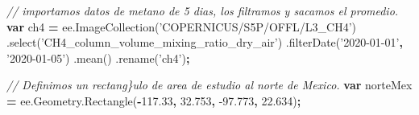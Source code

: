 \documentclass[
]{article}
\newenvironment{Shaded}{\begin{snugshade}}{\end{snugshade}}
\newcommand{\AttributeTok}[1]{\textcolor[rgb]{0.77,0.63,0.00}{#1}}
\newcommand{\CommentTok}[1]{\textcolor[rgb]{0.56,0.35,0.01}{\textit{#1}}}
\newcommand{\FloatTok}[1]{\textcolor[rgb]{0.00,0.00,0.81}{#1}}
\newcommand{\KeywordTok}[1]{\textcolor[rgb]{0.13,0.29,0.53}{\textbf{#1}}}
\newcommand{\NormalTok}[1]{#1}
\newcommand{\OperatorTok}[1]{\textcolor[rgb]{0.81,0.36,0.00}{\textbf{#1}}}
\newcommand{\StringTok}[1]{\textcolor[rgb]{0.31,0.60,0.02}{#1}}
\newcommand{\VariableTok}[1]{\textcolor[rgb]{0.00,0.00,0.00}{#1}}
\begin{document}
\begin{Shaded}
\begin{Highlighting}[]
\CommentTok{// importamos datos de metano de 5 dias, los filtramos y sacamos el promedio.}
\KeywordTok{var}\NormalTok{ ch4 }\OperatorTok{=} \VariableTok{ee}\NormalTok{.}\AttributeTok{ImageCollection}\NormalTok{(}\StringTok{'COPERNICUS/S5P/OFFL/L3_CH4'}\NormalTok{)}
\NormalTok{  .}\AttributeTok{select}\NormalTok{(}\StringTok{'CH4_column_volume_mixing_ratio_dry_air'}\NormalTok{)}
\NormalTok{  .}\AttributeTok{filterDate}\NormalTok{(}\StringTok{'2020-01-01'}\OperatorTok{,} \StringTok{'2020-01-05'}\NormalTok{)}
\NormalTok{  .}\AttributeTok{mean}\NormalTok{()}
\NormalTok{  .}\AttributeTok{rename}\NormalTok{(}\StringTok{'ch4'}\NormalTok{)}\OperatorTok{;}

\CommentTok{// Definimos un rectang\}ulo de area de estudio al norte de Mexico.}
\KeywordTok{var}\NormalTok{ norteMex }\OperatorTok{=}
  \VariableTok{ee}\NormalTok{.}\VariableTok{Geometry}\NormalTok{.}\AttributeTok{Rectangle}\NormalTok{(}\OperatorTok{-}\FloatTok{117.33}\OperatorTok{,} \FloatTok{32.753}\OperatorTok{,} \FloatTok{-97.773}\OperatorTok{,} \FloatTok{22.634}\NormalTok{)}\OperatorTok{;}


\end{Highlighting}
\end{Shaded}
\end{document}
